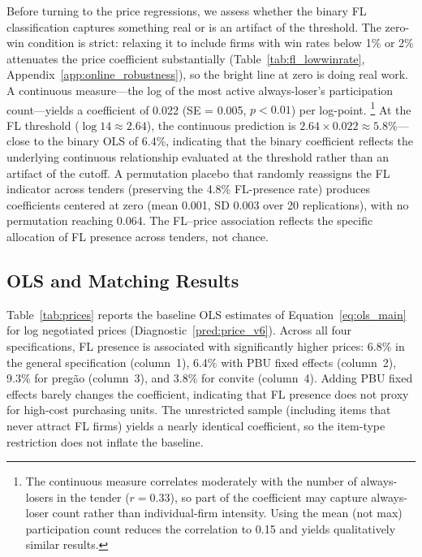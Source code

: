 Before turning to the price regressions, we assess whether the binary
FL classification captures something real or is an artifact of the
threshold. The zero-win condition is strict: relaxing it to include
firms with win rates below 1\% or 2\% attenuates the price coefficient
substantially (Table~\ref{tab:fl_lowwinrate},
Appendix~\ref{app:online_robustness}), so the bright line at zero is
doing real work. A continuous measure---the log of the most active
always-loser's participation count---yields a coefficient of 0.022
(SE = 0.005, $p < 0.01$) per log-point.%
\footnote{The continuous measure correlates moderately with the number
of always-losers in the tender ($r = 0.33$), so part of the
coefficient may capture always-loser count rather than individual-firm
intensity. Using the mean (not max) participation count reduces the
correlation to 0.15 and yields qualitatively similar results.}
At the FL threshold ($\log 14 \approx 2.64$), the continuous prediction
is $2.64 \times 0.022 \approx 5.8\%$---close to the binary OLS of
6.4\%, indicating that the binary coefficient reflects the underlying
continuous relationship evaluated at the threshold rather than an
artifact of the cutoff. A permutation placebo that randomly reassigns
the FL indicator across tenders (preserving the 4.8\% FL-presence rate)
produces coefficients centered at zero (mean 0.001, SD 0.003 over 20
replications), with no permutation reaching 0.064. The FL--price
association reflects the specific allocation of FL presence across
tenders, not chance.


\subsection{OLS and Matching Results}
\label{sec:results_ols}

Table~\ref{tab:prices} reports the baseline OLS estimates of
Equation~\eqref{eq:ols_main} for log negotiated prices
(Diagnostic~\ref{pred:price_v6}). Across all four
specifications, FL presence is associated with significantly higher
prices: 6.8\% in the general specification (column~1), 6.4\% with PBU
fixed effects (column~2), 9.3\% for preg\~ao (column~3), and 3.8\% for
convite (column~4). Adding PBU fixed effects barely changes the
coefficient, indicating that FL presence does not proxy for high-cost
purchasing units. The unrestricted sample (including items that never
attract FL firms) yields a nearly identical coefficient, so the
item-type restriction does not inflate the baseline.

